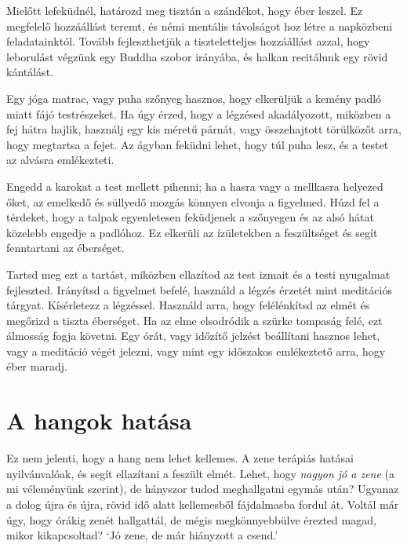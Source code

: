 \clearpage
\thispagestyle{empty}\mbox{}
\clearpage

Mielőtt lefeküdnél, határozd meg tisztán a szándékot, hogy éber leszel.
Ez megfelelő hozzáállást teremt, és némi mentális távolságot hoz létre a
napközbeni feladatainktól. Tovább fejleszthetjük a tiszteletteljes
hozzáállást azzal, hogy leborulást végzünk egy Buddha szobor irányába,
és halkan recitálunk egy rövid kántálást.

Egy jóga matrac, vagy puha szőnyeg hasznos, hogy elkerüljük a kemény
padló miatt fájó testrészeket. Ha úgy érzed, hogy a légzésed
akadályozott, miközben a fej hátra hajlik, használj egy kis méretű
párnát, vagy összehajtott törülközőt arra, hogy megtartsa a fejet. Az
ágyban feküdni lehet, hogy túl puha lesz, és a testet az alvásra
emlékezteti.

Engedd a karokat a test mellett pihenni; ha a hasra vagy a mellkasra
helyezed őket, az emelkedő és süllyedő mozgás könnyen elvonja a
figyelmed. Húzd fel a térdeket, hogy a talpak egyenletesen feküdjenek a
szőnyegen és az alsó hátat közelebb engedje a padlóhoz. Ez elkerüli az
ízületekben a feszültséget és segít fenntartani az éberséget.

Tartsd meg ezt a tartást, miközben ellazítod az test izmait és a testi
nyugalmat fejleszted. Irányítsd a figyelmet befelé, használd a légzés
érzetét mint meditációs tárgyat. Kísérletezz a légzéssel. Használd arra,
hogy felélénkítsd az elmét és megőrizd a tiszta éberséget. Ha az elme
elsodródik a szürke tompaság felé, ezt álmosság fogja követni. Egy órát,
vagy időzítő jelzést beállítani hasznos lehet, vagy a meditáció végét
jelezni, vagy mint egy időszakos emlékeztető arra, hogy éber maradj.

\clearpage

\section{A hangok hatása}


\noindent Ez nem jelenti, hogy a hang nem lehet kellemes. A zene
terápiás hatásai nyilvánvalóak, és segít ellazítani a feszült elmét.
Lehet, hogy \emph{nagyon jó a zene} (a mi véleményünk szerint), de
hányszor tudod meghallgatni egymás után? Ugyanaz a dolog újra és újra,
rövid idő alatt kellemesből fájdalmasba fordul át. Voltál már úgy, hogy
órákig zenét hallgattál, de mégis megkönnyebbülve érezted magad, mikor
kikapcsoltad? `Jó zene, de már hiányzott a csend.'

